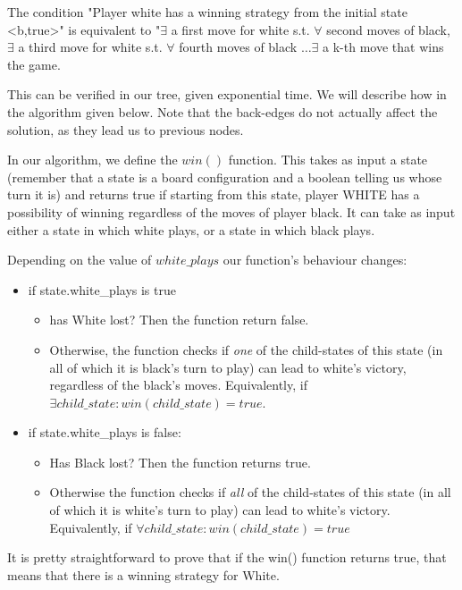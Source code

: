 The condition "Player white has a winning strategy from the initial state 
<b,true>" is equivalent to "$\exists$ a first move for white s.t. $\forall$ second moves 
of black, $\exists$ a third move for white s.t. $\forall$ fourth moves of black
$\ldots \exists$ a k-th move that wins the game.

This can be verified in our tree, given exponential time. We will describe how in the algorithm given below.
Note that the back-edges do not actually affect the solution, as they lead us to previous nodes.
\newline

In our algorithm, we define the $win()$ function. This takes as input a state (remember that 
a state is a board configuration and a boolean telling us whose turn it is) and returns true if
starting from this state, player WHITE has a possibility of winning regardless of the moves of player black. 
It can take as input either a state in which white plays, or a state in which black plays. 

Depending on the value of $white\_plays$ our function's behaviour changes:
\begin{itemize}
\item if state.white\_plays is true \begin{itemize} 
\item has White lost? Then the function return false.
\item Otherwise, the function checks if \emph{one} of the child-states of this state 
(in all of which it is black's turn to play) can lead to white's victory, regardless of the black's moves.
Equivalently, if $\exists child\_state : win(child\_state) = true $.
\end{itemize}

\item if state.white\_plays is false: \begin{itemize}
\item Has Black lost? Then the function returns true.
\item Otherwise the function checks if \emph{all} of the child-states of this state
(in all of which it is white's turn to play) can lead to white's victory. Equivalently, if $\forall child\_state: win(child\_state) = true $
\end{itemize}
\end{itemize}


It is pretty straightforward to prove that if the win() function returns true,
that means that there is a winning strategy for White.

